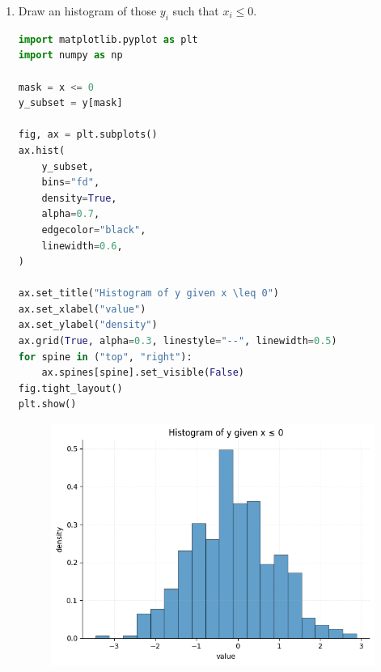 \documentclass[dvipsnames,11pt]{article}
\begin{document}
\begin{enumerate}
\begin{solution}
            \end{solution}
            
        \item Draw an histogram of those $y_i$ such that $x_i\leq 0$.

            \begin{solution}
    
\begin{lstlisting}[language=python]
import matplotlib.pyplot as plt
import numpy as np

mask = x <= 0
y_subset = y[mask]

fig, ax = plt.subplots()
ax.hist(
    y_subset,
    bins="fd",
    density=True,
    alpha=0.7,
    edgecolor="black",
    linewidth=0.6,
)

ax.set_title("Histogram of y given x \leq 0")
ax.set_xlabel("value")
ax.set_ylabel("density")
ax.grid(True, alpha=0.3, linestyle="--", linewidth=0.5)
for spine in ("top", "right"):
    ax.spines[spine].set_visible(False)
fig.tight_layout()
plt.show()
\end{lstlisting}
                
                \begin{figure}[h]
                    \centering
                    \includegraphics[width=0.5\linewidth]{q2c.png}
                \end{figure}
                
            \end{solution}
            
    \end{enumerate}
\end{document}
